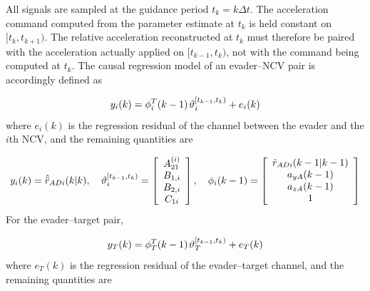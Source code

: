 All signals are sampled at the guidance period ${t_k} = k\Delta t$. The acceleration command computed from the parameter estimate at ${t_k}$ is held constant on $[{t_k},{t_{k + 1}})$. The relative acceleration reconstructed at ${t_k}$ must therefore be paired with the acceleration actually applied on $[{t_{k - 1}},{t_k})$, not with the command being computed at ${t_k}$. The causal regression model of an evader--NCV pair is accordingly defined as

\begin{equation}
\label{eq:51}
{y_i}(k) = \phi _i^T(k - 1){\kern 1pt} \vartheta _i^{[{t_{k - 1}},{t_k})} + {e_i}(k)
\end{equation}
where ${e_i}(k)$ is the regression residual of the channel between the evader and the $i$th NCV, and the remaining quantities are

\begin{equation}
\label{eq:52}
{y_i}(k) = \hatddot{r}_{ADi}(k|k),\quad \vartheta _i^{[{t_{k - 1}},{t_k})} = \left[ {\begin{array}{*{20}{c}}
  {A_{21}^{(i)}} \\ 
  {{B_{1,i}}} \\ 
  {{B_{2,i}}} \\ 
  {{C_{1i}}} 
\end{array}} \right],\quad {\phi _i}(k - 1) = \left[ {\begin{array}{*{20}{c}}
  {{{\hat r}_{ADi}}(k - 1|k - 1)} \\ 
  {{a_{yA}}(k - 1)} \\ 
  {{a_{zA}}(k - 1)} \\ 
  1 
\end{array}} \right]
\end{equation}
For the evader--target pair,

\begin{equation}
\label{eq:53}
{y_T}(k) = \phi _T^T(k - 1){\kern 1pt} \vartheta _T^{[{t_{k - 1}},{t_k})} + {e_T}(k)
\end{equation}
where ${e_T}(k)$ is the regression residual of the evader--target channel, and the remaining quantities are

